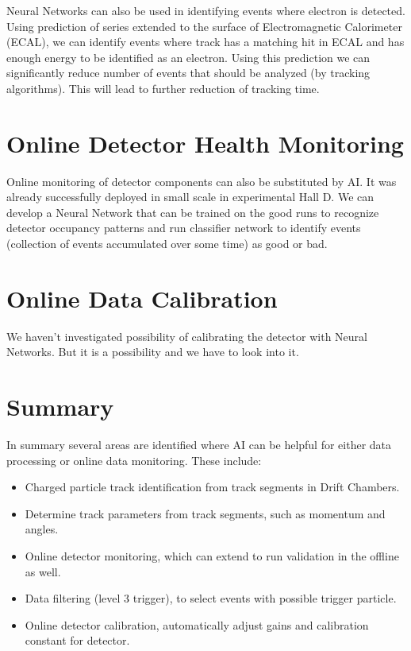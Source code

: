 \documentclass[11pt]{revtex4}
\begin{document}
Neural Networks can also be used in identifying events where electron is detected.
Using prediction of series extended to the surface of Electromagnetic Calorimeter
(ECAL), we can identify events where track has a matching hit in ECAL and has
enough energy to be identified as an electron. Using this prediction we can significantly
reduce number of events that should be analyzed (by tracking algorithms). This
will lead to further reduction of tracking time.

\section{Online Detector Health Monitoring}

Online monitoring of detector components can also be substituted by AI. It was
already successfully deployed in small scale in experimental Hall D. We can
develop a Neural Network that can be trained on the good runs to recognize
detector occupancy patterns and run classifier network to identify events
(collection of events accumulated over some time) as good or bad.

\section{Online Data Calibration}

We haven't investigated possibility of calibrating the detector with Neural
Networks. But it is a possibility and we have to look into it.

\section{Summary}

In summary several areas are identified where AI can be helpful for either
data processing or online data monitoring. These include:

\begin{itemize}
\item Charged particle track identification from track segments in Drift Chambers.
\item Determine track parameters from track segments, such as momentum and angles.
\item Online detector monitoring, which can extend to run validation in the offline as well.
\item Data filtering (level 3 trigger), to select events with possible trigger particle.
\item Online detector calibration, automatically adjust gains and calibration constant for detector.
\end{itemize}
\end{document}

